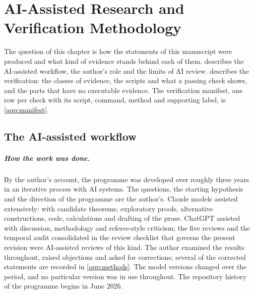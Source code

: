 \chapter{AI-Assisted Research and Verification Methodology}
\label{ch:ch15_methodology}

The question of this chapter is how the statements of this manuscript were produced and what kind of evidence stands behind each of them.
 describes the AI-assisted workflow, the author's role and the limits of AI review.  describes the verification:
the classes of evidence, the scripts and what a passing check shows, and the parts that have no executable evidence. The verification
manifest, one row per check with its script, command, method and supporting label, is \cref{app:manifest}.

\section{The AI-assisted workflow}
\label{sec:ai}

\paragraph{How the work was done.} By the author's account, the programme was developed over roughly three years in an iterative
process with AI systems. The questions, the starting hypothesis and the direction of the programme are the author's. Claude models
assisted extensively: with candidate theorems, exploratory proofs, alternative constructions, code, calculations and drafting of the prose.
ChatGPT assisted with discussion, methodology and referee-style criticism; the five reviews and the temporal audit consolidated in the review
checklist that governs the present revision were AI-assisted reviews of this kind. The author examined the results throughout, raised
objections and asked for corrections; several of the corrected statements are recorded in \cref{app:methods}. The model versions changed over
the period, and no particular version was in use throughout. The repository history of the programme begins in June 2026.

